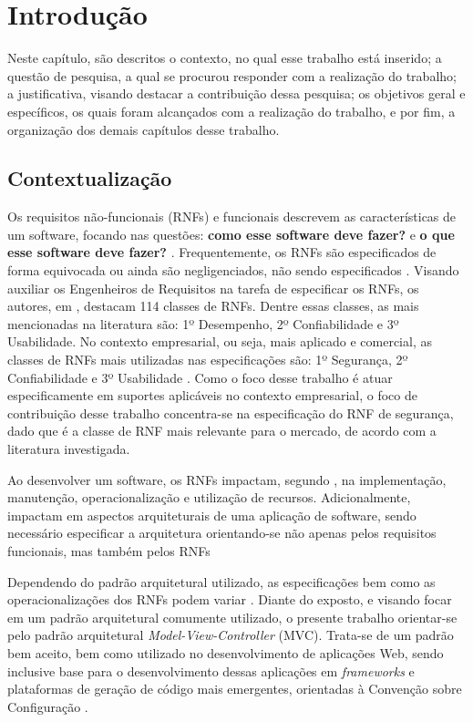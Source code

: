 \chapter{Introdução}
\label{chap:introducao}

Neste capítulo, são descritos o contexto, no qual esse trabalho está inserido; a questão de pesquisa,  a qual se procurou responder com a realização do trabalho; a justificativa, visando destacar a contribuição dessa pesquisa; os objetivos geral e específicos, os quais foram alcançados com a realização do trabalho, e por fim, a organização dos demais capítulos desse trabalho.

\section{Contextualização}

Os requisitos não-funcionais (RNFs) e funcionais descrevem as características de um software, focando nas questões: \textbf{como esse software deve fazer?} e \textbf{o que esse software deve fazer?}  \cite{sommerville1997requirements}. Frequentemente, os RNFs são especificados de forma equivocada ou ainda são negligenciados, não sendo especificados \cite{eckhardt2016non}. Visando auxiliar os Engenheiros de Requisitos na tarefa de especificar os RNFs, os autores, em \cite{mairiza2010investigation}, destacam 114 classes de RNFs. Dentre essas classes, as mais mencionadas na literatura são: 1º Desempenho, 2º Confiabilidade e  3º Usabilidade. No contexto empresarial, ou seja, mais aplicado e comercial, as classes de RNFs mais utilizadas nas especificações são: 1º Segurança, 2º Confiabilidade e 3º Usabilidade \cite{eckhardt2016non}. Como o foco desse trabalho é atuar especificamente em suportes aplicáveis no contexto empresarial, o foco de contribuição desse trabalho concentra-se na especificação do RNF de segurança, dado que é a classe de RNF mais relevante para o mercado, de acordo com a literatura investigada.

Ao desenvolver um software, os RNFs impactam, segundo \cite{eckhardt2016non}, na implementação, manutenção, operacionalização e utilização de recursos. Adicionalmente, impactam em aspectos arquiteturais de uma aplicação de software, sendo necessário especificar a arquitetura orientando-se não apenas pelos requisitos funcionais, mas também pelos RNFs \cite{buschmann1996system}

Dependendo do padrão arquitetural utilizado, as especificações bem como as operacionalizações dos RNFs podem variar \cite{chung2012non}. Diante do exposto, e visando focar em um padrão arquitetural comumente utilizado, o presente trabalho orientar-se pelo padrão arquitetural \textit{Model-View-Controller} (MVC). Trata-se de um padrão bem aceito, bem como utilizado no desenvolvimento de aplicações Web, sendo inclusive base para o desenvolvimento dessas aplicações em \textit{frameworks} e plataformas de geração de código mais emergentes, orientadas à Convenção sobre Configuração \cite{jailia2016behavior}.


